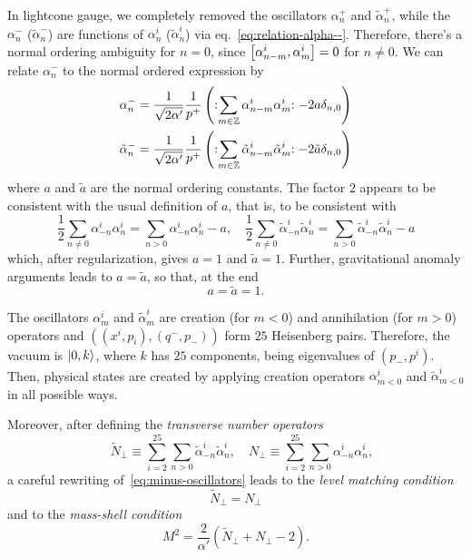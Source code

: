 In lightcone gauge, we completely removed the oscillators $\alpha^+_n$ and $\tilde{\alpha}^+_n$, while the $\alpha^-_n$ ($\tilde{\alpha}^-_n$) are functions of $\alpha^i_n$ ($\tilde{\alpha}^i_n$) via eq.~\eqref{eq:relation-alpha--}. Therefore, there's a normal ordering ambiguity for $n=0$, since $\comm{\alpha^i_{n-m}}{\alpha^i_m} = 0$ for $n \neq 0$. We can relate $\alpha^-_n$ to the normal ordered expression by
\begin{equation}\label{eq:minus-oscillators}
\begin{aligned}
    \alpha^-_n &= \frac{1}{\sqrt{2\alpha'}} \frac{1}{p^+} \left( :\mathrel{\sum_{m \in \mathbb{Z}} \alpha^i_{n-m} \alpha^i_m}: - 2 a \delta_{n,0} \right) \\
    \tilde{\alpha}^-_n &= \frac{1}{\sqrt{2\alpha'}} \frac{1}{p^+} \left( :\mathrel{\sum_{m \in \mathbb{Z}} \tilde{\alpha}^i_{n-m} \tilde{\alpha}^i_m}: - 2 \tilde{a} \delta_{n,0} \right) 
\end{aligned}
\end{equation}
where $a$ and $\tilde{a}$ are the normal ordering constants. The factor $2$ appears to be consistent with the usual definition of $a$, that is, to be consistent with
\begin{equation}
    \frac{1}{2} \sum_{n\neq 0} \alpha^i_{-n} \alpha^i_n = \sum_{n>0} \alpha^i_{-n} \alpha^i_n - a, \quad \frac{1}{2} \sum_{n\neq 0} \tilde{\alpha}^i_{-n} \tilde{\alpha}^i_n = \sum_{n>0} \tilde{\alpha}^i_{-n} \tilde{\alpha}^i_n - a
\end{equation}
which, after regularization, gives $a = 1$ and $\tilde{a}=1$. Further, gravitational anomaly arguments leads to $a=\tilde{a}$, so that, at the end
\begin{equation}\label{eq:ordering-constants}
    a = \tilde{a} = 1.
\end{equation}

The oscillators $\alpha^i_m$ and $\tilde{\alpha}^i_m$ are creation (for $m < 0$) and annihilation (for $m>0$) operators and $( (x^i,p_i),(q^-,p_-) )$ form $25$ Heisenberg pairs. Therefore, the vacuum is $\ket{0,k}$, where $k$ has $25$ components, being eigenvalues of $(p_-,p^i)$. Then, physical states are created by applying creation operators $\alpha^i_{m<0}$ and $\tilde{\alpha}^i_{m<0}$ in all possible ways.

Moreover, after defining the \emph{transverse number operators}
\begin{equation}\label{eq:def-transverse-number-op}
    \quad \tilde{N}_\perp \equiv \sum_{i=2}^{25}\sum_{n>0} \tilde{\alpha}^i_{-n} \tilde{\alpha}^i_n, \quad {N}_\perp \equiv \sum_{i=2}^{25}\sum_{n>0} {\alpha}^i_{-n} {\alpha}^i_n ,
\end{equation}
a careful rewriting of~\eqref{eq:minus-oscillators} leads to the \emph{level matching condition}
\begin{equation}\label{eq:level-matching}
    \tilde{N}_\perp =  N_\perp
\end{equation}
and to the \emph{mass-shell condition}
\begin{equation}\label{eq:mass-shell}
    M^2 = \frac{2}{\alpha'} (\tilde{N}_\perp + N_\perp - 2) .
\end{equation}

